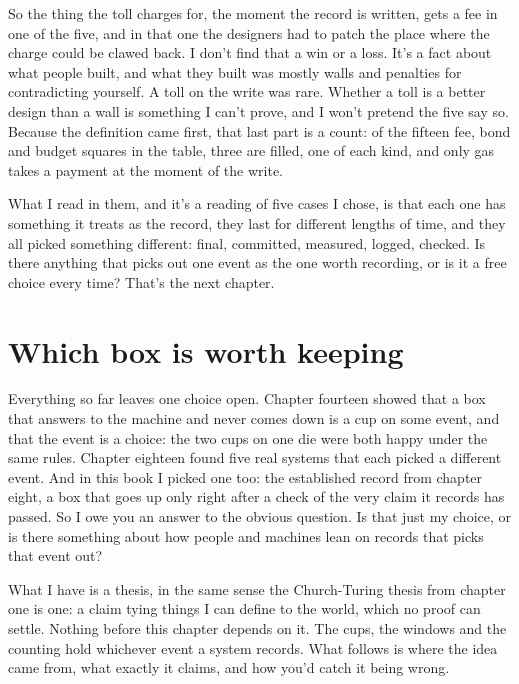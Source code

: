 \documentclass[11pt,twoside]{article}
\theoremstyle{thielethm}
\theoremstyle{thieledef}
\theoremstyle{thieledef}
\theoremstyle{thieledef}
\theoremstyle{thielethm}
\theoremstyle{thieleobs}
\theoremstyle{thielethm}
\begin{document}
So the thing the toll charges for, the moment the record is written, gets a fee in one of the five, and in that one the designers had to patch the place where the charge could be clawed back. I don't find that a win or a loss. It's a fact about what people built, and what they built was mostly walls and penalties for contradicting yourself. A toll on the write was rare. Whether a toll is a better design than a wall is something I can't prove, and I won't pretend the five say so. Because the definition came first, that last part is a count: of the fifteen fee, bond and budget squares in the table, three are filled, one of each kind, and only gas takes a payment at the moment of the write.

What I read in them, and it's a reading of five cases I chose, is that each one has something it treats as the record, they last for different lengths of time, and they all picked something different: final, committed, measured, logged, checked. Is there anything that picks out one event as the one worth recording, or is it a free choice every time? That's the next chapter.

\section{Which box is worth keeping}
\label{sec:worth-keeping}

Everything so far leaves one choice open. Chapter fourteen showed that a box that answers to the machine and never comes down is a cup on some event, and that the event is a choice: the two cups on one die were both happy under the same rules. Chapter eighteen found five real systems that each picked a different event. And in this book I picked one too: the established record from chapter eight, a box that goes up only right after a check of the very claim it records has passed. So I owe you an answer to the obvious question. Is that just my choice, or is there something about how people and machines lean on records that picks that event out?

What I have is a thesis, in the same sense the Church-Turing thesis from chapter one is one: a claim tying things I can define to the world, which no proof can settle. Nothing before this chapter depends on it. The cups, the windows and the counting hold whichever event a system records. What follows is where the idea came from, what exactly it claims, and how you'd catch it being wrong.
\end{document}
